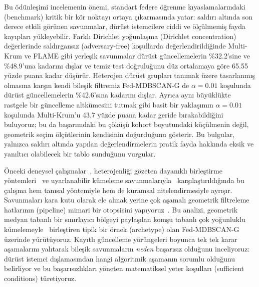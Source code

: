 \documentclass[journal]{IEEEtran}
\newcommand{\method}{Fed-MDBSCAN-G}
\begin{document}
Bu ödünleşimi incelemenin önemi, standart federe öğrenme kıyaslamalarındaki (benchmark) kritik bir kör noktayı ortaya çıkarmasında yatar: saldırı altında son derece etkili görünen savunmalar, dürüst istemcilere ciddi ve ölçülmemiş fayda kayıpları yükleyebilir. Farklı Dirichlet yoğunlaşma (Dirichlet concentration) değerlerinde saldırgansız (adversary-free) koşullarda değerlendirildiğinde Multi-Krum ve FLAME gibi yerleşik savunmalar dürüst güncellemelerin \%32.2'sine ve \%48.9'una kadarını dışlar ve temiz test doğruluğunu düz ortalamaya göre 65.55 yüzde puana kadar düşürür. Heterojen dürüst grupları tanımak üzere tasarlanmış olmasına karşın kendi bileşik filtremiz \method{} de $\alpha=0.01$ koşulunda dürüst güncellemelerin \%42.6'sına kadarını dışlar. Ayrıca aynı büyüklükte rastgele bir güncelleme altkümesini tutmak gibi basit bir yaklaşımın $\alpha=0.01$ koşulunda Multi-Krum'u 43.7 yüzde puana kadar geride bırakabildiğini buluyoruz; bu da başarımdaki bu çöküşü kohort boyutundaki küçülmenin değil, geometrik seçim ölçütlerinin kendisinin doğurduğunu gösterir. Bu bulgular, yalnızca saldırı altında yapılan değerlendirmelerin pratik fayda hakkında eksik ve yanıltıcı olabilecek bir tablo sunduğunu vurgular.

Önceki deneysel çalışmalar~\cite{li2024experimental}, heterojenliği gözeten dayanıklı birleştirme yöntemleri~\cite{liu2023byzantine} ve uyarlanabilir kümeleme savunmalarıyla~\cite{wang2023adaptive} karşılaştırıldığında bu çalışma hem tanısal yöntemiyle hem de kuramsal nitelendirmesiyle ayrışır. Savunmaları kara kutu olarak ele almak yerine çok aşamalı geometrik filtreleme hatlarının (pipeline) mimari bir otopsisini yapıyoruz~\cite{mia2025bart}. Bu analizi, geometrik medyan tabanlı bir sınırlayıcı bölgeyi paylaşılan komşu tabanlı çok yoğunluklu kümelemeyle~\cite{qian2024mdbscan} birleştiren tipik bir örnek (archetype) olan \method{} üzerinde yürütüyoruz. Kayıtlı güncelleme yörüngeleri boyunca tek tek karar aşamalarını yalıtarak bileşik savunmaların \emph{neden} başarısız olduğunu inceliyoruz: dürüst istemci dışlamasından hangi algoritmik aşamanın sorumlu olduğunu belirliyor ve bu başarısızlıkları yöneten matematiksel yeter koşulları (sufficient conditions) türetiyoruz.
\end{document}
